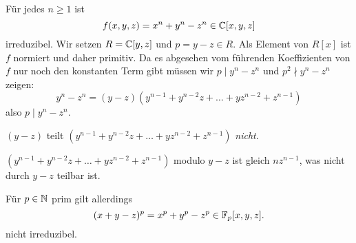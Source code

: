 \begin{eg}
	Für jedes $n \geq 1$ ist 
	\[
		f(x,y,z) = x^{n} + y^{n} - z^{n} \in \mathbb{C}[x,y,z]
	\] 
	irreduzibel.
	Wir setzen $R = \mathbb{C}[y,z]$ und $p = y-z \in R$.
	Als Element von $R[x]$ ist $f$ normiert und daher primitiv.
	Da es abgesehen vom führenden Koeffizienten von $f$ nur noch den konstanten Term gibt müssen wir $p \mid y^{n} - z^{n}$ und $p^2 \nmid y^{n} - z^{n}$ zeigen:
	\[
		y^{n} - z^{n} = (y-z)(y^{n-1} + y^{n-2} z + \ldots + y z ^{n-2} + z^{n-1})
	\] 
	also $p \mid y^{n} - z^{n}$.
	\begin{claim}
		$(y-z)$ teilt $(y^{n-1} + y^{n-2} z + \ldots + y z ^{n-2} + z^{n-1})$ \emph{nicht}.
	\end{claim}
	$(y^{n-1} + y^{n-2} z + \ldots + y z ^{n-2} + z^{n-1})$ modulo  $y-z$ ist gleich $n z^{n-1}$, was nicht durch $y-z$ teilbar ist.
\end{eg}

\begin{remark}
	Für $p \in \mathbb{N}$ prim gilt allerdings
	\[
		(x+y-z)^{p} = x^{p} + y^{p} - z^{p} \in \mathbb{F}_{p}[x,y,z]
	.\]
	nicht irreduzibel.
\end{remark}


















